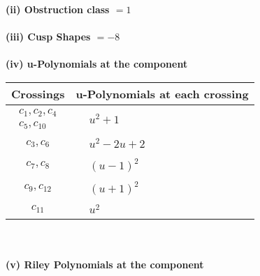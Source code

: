 \documentclass[1p]{elsarticle_modified}
\theoremstyle{definition}
\begin{document}
\flushleft \textbf{(ii) Obstruction class $= 1$}\\~\\
\flushleft \textbf{(iii) Cusp Shapes $= -8$}\\~\\
\newpage\renewcommand{\arraystretch}{1}
\flushleft \textbf{(iv) u-Polynomials at the component}\newline \\
\begin{tabular}{m{50pt}|m{274pt}}
Crossings & \hspace{64pt}u-Polynomials at each crossing \\
\hline $$\begin{aligned}c_{1},c_{2},c_{4}\\c_{5},c_{10}\end{aligned}$$&$\begin{aligned}
&u^2+1
\end{aligned}$\\
\hline $$\begin{aligned}c_{3},c_{6}\end{aligned}$$&$\begin{aligned}
&u^2-2 u+2
\end{aligned}$\\
\hline $$\begin{aligned}c_{7},c_{8}\end{aligned}$$&$\begin{aligned}
&(u-1)^2
\end{aligned}$\\
\hline $$\begin{aligned}c_{9},c_{12}\end{aligned}$$&$\begin{aligned}
&(u+1)^2
\end{aligned}$\\
\hline $$\begin{aligned}c_{11}\end{aligned}$$&$\begin{aligned}
&u^2
\end{aligned}$\\
\hline
\end{tabular}\\~\\
\newpage\renewcommand{\arraystretch}{1}
\flushleft \textbf{(v) Riley Polynomials at the component}\newline \\
\end{document}
